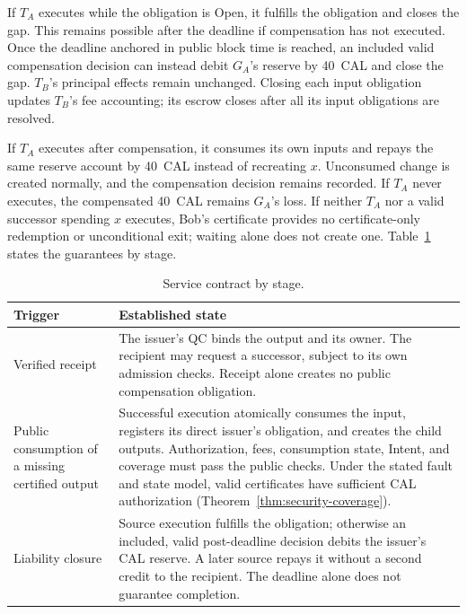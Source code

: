 If $T_A$ executes while the obligation is Open, it fulfills the obligation and closes the gap. This remains possible after the deadline if compensation has not executed. Once the deadline anchored in public block time is reached, an included valid compensation decision can instead debit $G_A$'s reserve by 40~CAL and close the gap. $T_B$'s principal effects remain unchanged. Closing each input obligation updates $T_B$'s fee accounting; its escrow closes after all its input obligations are resolved.

If $T_A$ executes after compensation, it consumes its own inputs and repays the same reserve account by 40~CAL instead of recreating $x$. Unconsumed change is created normally, and the compensation decision remains recorded. If $T_A$ never executes, the compensated 40~CAL remains $G_A$'s loss. If neither $T_A$ nor a valid successor spending $x$ executes, Bob's certificate provides no certificate-only redemption or unconditional exit; waiting alone does not create one. Table~\ref{tab:model-contract} states the guarantees by stage.

\begin{table}[!t]
\caption{Service contract by stage.}
\label{tab:model-contract}
\centering\small
\begin{tabular}{@{}>{\raggedright\arraybackslash}p{}>{\raggedright\arraybackslash}p{}@{}}
\toprule
Trigger & Established state \\
\midrule
Verified receipt &
The issuer's QC binds the output and its owner. The recipient may
request a successor, subject to its own admission checks. Receipt
alone creates no public compensation obligation. \\
Public consumption of a missing certified output &
Successful execution atomically consumes the input, registers its
direct issuer's obligation, and creates the child outputs.
Authorization, fees, consumption state, Intent, and coverage must pass the
public checks. Under the stated fault and state model, valid certificates have sufficient CAL authorization (Theorem~\ref{thm:security-coverage}). \\
Liability closure &
Source execution fulfills the obligation; otherwise an included,
valid post-deadline decision debits the issuer's CAL reserve.
A later source repays it without a second credit to the recipient.
The deadline alone does not guarantee completion. \\
\bottomrule
\end{tabular}
\end{table}

